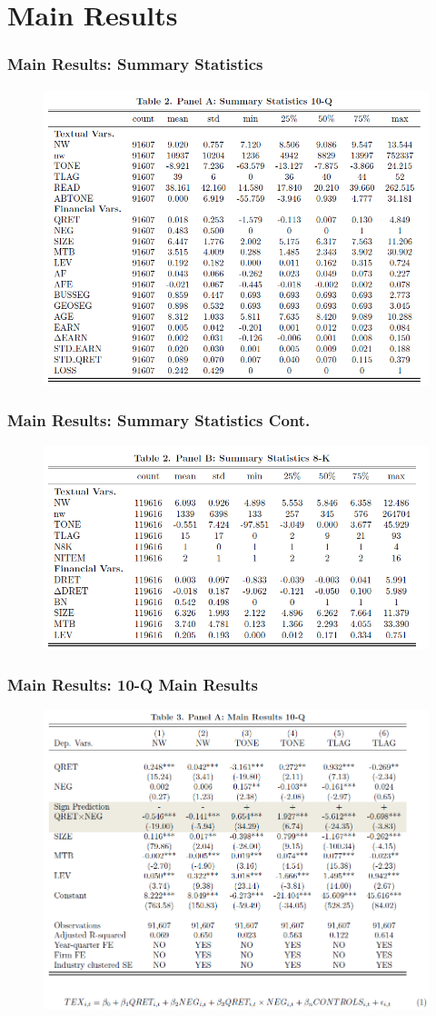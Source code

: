 \documentclass{beamer}
\begin{document}
\section{Main Results}
\begin{frame}
\frametitle{Main Results: Summary Statistics}
\begin{figure}[h]
	\centering
	\includegraphics[width=0.7\linewidth]{tab2panA}
	\label{tab2panA}
\end{figure}

\end{frame}
\begin{frame}
	\frametitle{Main Results: Summary Statistics Cont.}
	\begin{figure}[h]
		\centering
		\includegraphics[width=0.65\linewidth]{tab2panB}
		\label{tab2panB}
	\end{figure}
	
\end{frame}
\begin{frame}
\frametitle{Main Results: 10-Q Main Results}
	\begin{figure}[h]
		\centering
		\includegraphics[width=0.7\linewidth]{tab3panA}
		\label{tab3panA}
	\end{figure}
\end{frame}
\end{document}
